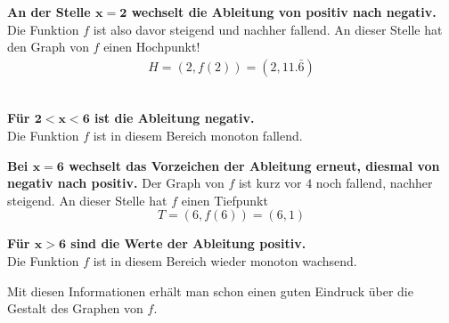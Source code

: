 \begin{examplebreak}
    \textbf{An der Stelle $\boldsymbol{x=2}$ wechselt die Ableitung von positiv nach negativ.}\\
    Die Funktion $f$ ist also davor steigend und nachher fallend. An dieser Stelle hat den Graph von $f$ einen Hochpunkt!
    \begin{align*}
        H=(2, f(2))=(2, 11.\bar{6})
    \end{align*}\\
    \vspace{0.5cm}

    \textbf{Für $\boldsymbol{2 < x < 6}$ ist die Ableitung negativ.}\\
    Die Funktion $f$ ist in diesem Bereich monoton fallend.\\
    \vspace{0.5cm}

    \textbf{Bei $\boldsymbol{x=6}$ wechselt das Vorzeichen der Ableitung erneut, diesmal von negativ nach positiv.} Der Graph von $f$ ist kurz vor $4$ noch fallend, nachher steigend. An dieser Stelle hat $f$ einen Tiefpunkt
    \[
        T = (6, f(6))=(6, 1)
    \]
    \vspace{0.5cm}

    \textbf{Für $\boldsymbol{x>6}$ sind die Werte der Ableitung positiv.}\\
    Die Funktion $f$ ist in diesem Bereich wieder monoton wachsend.\\
    \vspace{0.5cm}

    Mit diesen Informationen erhält man schon einen guten Eindruck über die Gestalt des Graphen von $f$.
    \begin{figure}[H]
    \end{figure}
\end{examplebreak}

